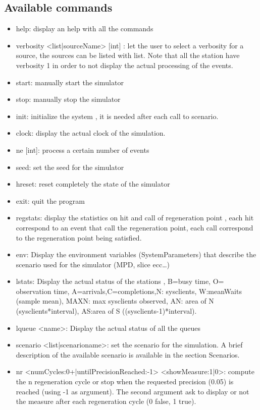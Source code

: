 \documentclass[12pt,a4paper]{article}
\begin{document}
    \subsection{Available commands}  
    \begin{itemize}
        \item help: display an help with all the commands 
        \item verbosity <list|sourceName> [int] : let the user to select a verbosity for a source, the sources can be listed with list. Note that all the station have verbosity 1 in order to not display the actual processing of the events.
        \item start: manually start the simulator
        \item stop: manually stop the simulator 
        \item init: initialize the system , it is needed after each call to scenario.
        \item clock: display the actual clock of the simulation.
        \item ne [int]: process a certain number of events 
        \item seed: set the seed for the simulator 
        \item hreset: reset completely the state of the simulator 
        \item exit: quit the program 
        \item regstats: display the statistics on hit and call of regeneration point , each hit correspond to an event that call the regeneration point, each call correspond to the regeneration point being satisfied.
        \item env: Display the environment variables (SystemParameters) that describe the scenario used for the simulator (MPD, slice ecc\dots)
        \item lstats: Display the actual status of the stations , B=busy time, O= observation time, A=arrivals,C=completions,N: sysclients, W:meanWaits (sample mean), MAXN: max sysclients observed, AN: area of N (sysclients*interval), AS:area of S ((sysclients-1)*interval).
        \item lqueue <name>: Display the actual status of all the queues
        \item scenario <list|scenarioname>: set the scenario for the simulation. A brief description of the available scenario is available in the section Scenarios.
        \item nr <numCycles:0+|untilPrecisionReached:-1> <showMeasure:1|0>: compute the n regeneration cycle or stop when the requested precision (0.05) is reached (using -1 as argument). The second argument ask to display or not the measure after each regeneration cycle (0 false, 1 true).

\end{itemize}
\end{document}
